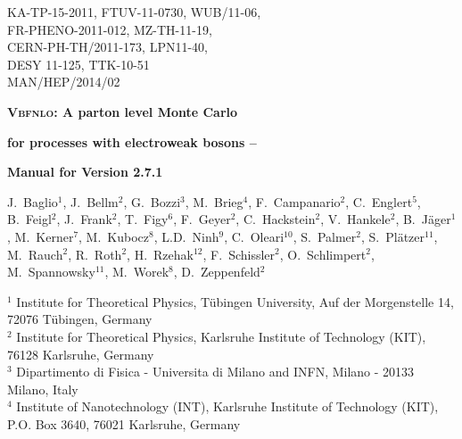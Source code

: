 \documentclass[english,12pt]{article}
\begin{document}
\begin{titlepage}
{\begin{flushright}{
 \begin{minipage}{8.5cm}
  KA-TP-15-2011,  FTUV-11-0730,  WUB/11-06, \\ 
  FR-PHENO-2011-012,  MZ-TH-11-19, \\ 
  CERN-PH-TH/2011-173,  LPN11-40, \\ 
  DESY 11-125,  TTK-10-51 \\
  MAN/HEP/2014/02
\end{minipage}}\end{flushright}}
\vspace{1cm}
\begin{center} {\Large \bf \textsc{Vbfnlo}: A parton level Monte Carlo
    } 
\end{center}
\begin{center}
 {\Large \bf  for processes with electroweak bosons --}
\end{center}
\begin{center}
 {\Large \bf  Manual for Version 2.7.1}
\end{center}
\vspace{0.6cm}
\begin{center}
{\renewcommand{\baselinestretch}{4}
J.~Baglio$^{1}$, J.~Bellm$^{2}$, G.~Bozzi$^{3}$,
M.~Brieg$^{4}$, F.~Campanario$^{2}$, C.~Englert$^{5}$, B.~Feigl$^{2}$,
J.~Frank$^{2}$, T.~Figy$^{6}$, F.~Geyer$^{2}$, C.~Hackstein$^{2}$,
V.~Hankele$^{2}$, B.~J\"ager$^{1}$, M.~Kerner$^{7}$,
M.~Kubocz$^{8}$, L.D.~Ninh$^{9}$, C.~Oleari$^{10}$, S.~Palmer$^{2}$,
S.~Pl\"atzer$^{11}$, M.~Rauch$^{2}$, R.~Roth$^{2}$, H.~Rzehak$^{12}$,
F.~Schissler$^{2}$, O.~Schlimpert$^{2}$, M.~Spannowsky$^{11}$,
M.~Worek$^{8}$, D.~Zeppenfeld$^{2}$
}
\end{center}
\vspace{0.4cm}
\begin{center}
$^{1}$ Institute for Theoretical Physics, T\"{u}bingen University, Auf der Morgenstelle 14, 72076 T\"{u}bingen, Germany \\ \noindent
$^{2}$ Institute for Theoretical Physics, Karlsruhe Institute of Technology (KIT), 76128 Karlsruhe, Germany \\ \noindent
$^{3}$ Dipartimento di Fisica - Universita di Milano and INFN, Milano - 20133 Milano, Italy\\ \noindent
$^{4}$ Institute of Nanotechnology (INT), Karlsruhe Institute of Technology (KIT), P.O. Box 3640, 76021 Karlsruhe, Germany \\ \noindent

\end{center}
\end{titlepage}
\end{document}
